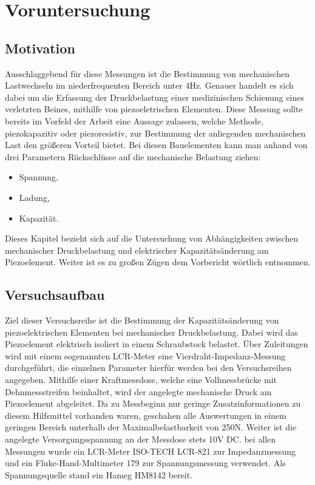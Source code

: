 \documentclass[12pt]{scrreprt} %
\begin{document}
\chapter{Voruntersuchung}

\section{Motivation}
Ausschlaggebend für diese Messungen ist die Bestimmung von mechanischen Lastwechseln im niederfrequenten Bereich unter 4Hz. Genauer handelt es sich dabei um die Erfassung der Druckbelastung einer medizinischen Schienung eines verletzten Beines, mithilfe von piezoeletrischen Elementen. Diese Messung sollte bereits im Vorfeld der Arbeit eine Aussage zulassen, welche Methode, piezokapazitiv oder piezoresistiv, zur Bestimmung der anliegenden mechanischen Last den größeren Vorteil bietet. Bei diesen Bauelementen kann man anhand von drei Parametern Rückschlüsse auf die mechanische Belastung ziehen:
\begin{itemize}
\item Spannung,
\item Ladung,
\item Kapazität.
\end{itemize}
Dieses Kapitel bezieht sich auf die Untersuchung von Abhängigkeiten zwischen mechanischer Druckbelastung und elektrischer Kapazitätsänderung am Piezoelement. Weiter ist es zu großen Zügen dem Vorbericht \citep{Jobstmann2012} wörtlich entnommen.
\section{Versuchsaufbau}

Ziel dieser Versuchsreihe ist die Bestimmung der Kapazitätsänderung von piezoelektrischen Elementen bei mechanischer Druckbelastung. Dabei wird das Piezoelement elektrisch isoliert in einem Schraubstock belastet. Über Zuleitungen wird mit einem sogenannten LCR-Meter eine Vierdraht-Impedanz-Messung durchgeführt, die einzelnen Parameter hierfür werden bei den Versuchsreihen angegeben. Mithilfe einer Kraftmessdose, welche eine Vollmessbrücke mit Dehnmessstreifen beinhaltet, wird der angelegte mechanische Druck am Piezoelement abgeleitet. Da zu Messbeginn nur geringe Zusatzinformationen zu diesem Hilfsmittel vorhanden waren, geschahen alle Auswertungen in einem geringen Bereich unterhalb der Maximalbelastbarkeit von 250N. Weiter ist die angelegte Versorgungsspannung an der Messdose stets 10V DC. bei allen Messungen wurde ein LCR-Meter ISO-TECH LCR-821 zur Impedanzmessung und ein Fluke-Hand-Multimeter 179 zur Spannungsmessung verwendet. Als Spannungsquelle stand ein Hameg HM8142 bereit.
\end{document}
